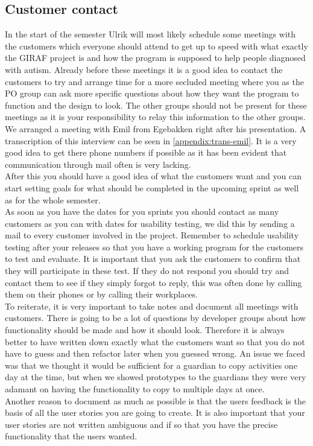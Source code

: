 \subsection{Customer contact}
In the start of the semester Ulrik will most likely schedule some meetings with the customers which everyone should attend to get up to speed with what exactly the GIRAF project is and how the program is supposed to help people diagnosed with autism.
Already before these meetings it is a good idea to contact the customers to try and arrange time for a more secluded meeting where you as the PO group can ask more specific questions about how they want the program to function and the design to look.
The other groups should not be present for these meetings as it is your responsibility to relay this information to the other groups.
We arranged a meeting with Emil from Egebakken right after his presentation. 
A transcription of this interview can be seen in \autoref{appendix:trans-emil}.
It is a very good idea to get there phone numbers if possible as it has been evident that communication through mail often is very lacking.
\\
After this you should have a good idea of what the customers want and you can start setting goals for what should be completed in the upcoming sprint as well as for the whole semester.
\\
As soon as you have the dates for you sprints you should contact as many customers as you can with dates for usability testing, we did this by sending a mail to every customer involved in the project.
Remember to schedule usability testing after your releases so that you have a working program for the customers to test and evaluate.
It is important that you ask the customers to confirm that they will participate in these test.
If they do not respond you should try and contact them to see if they simply forgot to reply, this was often done by calling them on their phones or by calling their workplaces.
\\
To reiterate, it is very important to take notes and document all meetings with customers.
There is going to be a lot of questions by developer groups about how functionality should be made and how it should look.
Therefore it is always better to have written down exactly what the customers want so that you do not have to guess and then refactor later when you guessed wrong.
An issue we faced was that we thought it would be sufficient for a guardian to copy activities one day at the time, but when we showed prototypes to the guardians they were very adamant on having the functionality to copy to multiple days at once.
\\
Another reason to document as much as possible is that the users feedback is the basis of all the user stories you are going to create.
It is also important that your user stories are not written ambiguous and if so that you have the precise functionality that the users wanted.

